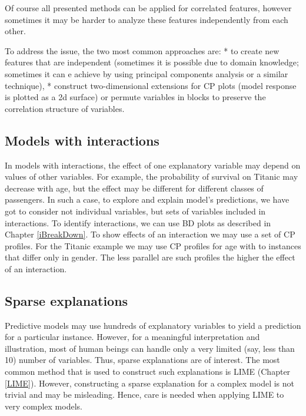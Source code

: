 \documentclass[12pt,]{krantz}
\begin{document}
Of course all presented methods can be applied for correlated features, however sometimes it may be harder to analyze these features independently from each other.

To address the issue, the two most common approaches are:
* to create new features that are independent (sometimes it is possible due to domain knowledge; sometimes it can e achieve by using principal components analysis or a similar technique),
* construct two-dimensional extensions for CP plots (model response is plotted as a 2d surface) or permute variables in blocks to preserve the correlation structure of variables.

\hypertarget{models-with-interactions}{%
\subsection{Models with interactions}\label{models-with-interactions}}

In models with interactions, the effect of one explanatory variable may depend on values of other variables. For example, the probability of survival on Titanic may decrease with age, but the effect may be different for different classes of passengers.
In such a case, to explore and explain model's predictions, we have got to consider not individual variables, but sets of variables included in interactions. To identify interactions, we can use BD plots as described in Chapter \ref{iBreakDown}. To show effects of an interaction we may use a set of CP profiles. For the Titanic example we may use CP profiles for age with to instances that differ only in gender. The less parallel are such profiles the higher the effect of an interaction.

\hypertarget{sparse-explanations}{%
\subsection{Sparse explanations}\label{sparse-explanations}}

Predictive models may use hundreds of explanatory variables to yield a prediction for a particular instance. However, for a meaningful interpretation and illustration, most of human beings can handle only a very limited (say, less than 10) number of variables. Thus, sparse explanations are of interest. The most common method that is used to construct such explanations is LIME (Chapter \ref{LIME}). However, constructing a sparse explanation for a complex model is not trivial and may be misleading. Hence, care is needed when applying LIME to very complex models.
\end{document}
